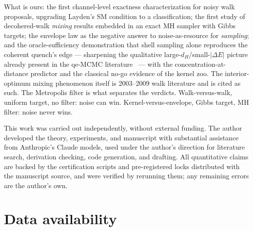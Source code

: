 \documentclass[aps,prx,reprint,floatfix,amsmath,amssymb,amsfonts]{revtex4-2}
\begin{document}
What is ours: the first channel-level exactness characterization for
noisy walk proposals, upgrading Layden's SM condition to a
classification; the first study of decohered-walk \emph{mixing} results
embedded in an exact MH sampler with Gibbs targets; the envelope law
as the negative answer to noise-as-resource for \emph{sampling}; and
the oracle-sufficiency demonstration that shell sampling alone
reproduces the coherent quench's edge --- sharpening the qualitative
large-$d_H$/small-$|\Delta E|$ picture already present in the qe-MCMC
literature~\cite{Ferguson2025,AraiKadowaki2025,Cao2026} --- with the
concentration-at-distance predictor and the classical no-go evidence
of the kernel zoo. The
interior-optimum mixing phenomenon itself is 2003--2009 walk literature
and is cited as such. The Metropolis filter is what separates the
verdicts. Walk-versus-walk, uniform target, no filter: noise can win.
Kernel-versus-envelope, Gibbs target, MH filter: noise never wins.

\begin{acknowledgments}
This work was carried out independently, without external funding.
The author developed the theory, experiments, and manuscript with
substantial assistance from Anthropic's Claude models, used under the
author's direction for literature search, derivation checking, code
generation, and drafting. All quantitative claims are backed by the
certification scripts and pre-registered locks distributed with the
manuscript source, and were verified by rerunning them; any remaining
errors are the author's own.
\end{acknowledgments}

\section*{Data availability}
\end{document}
